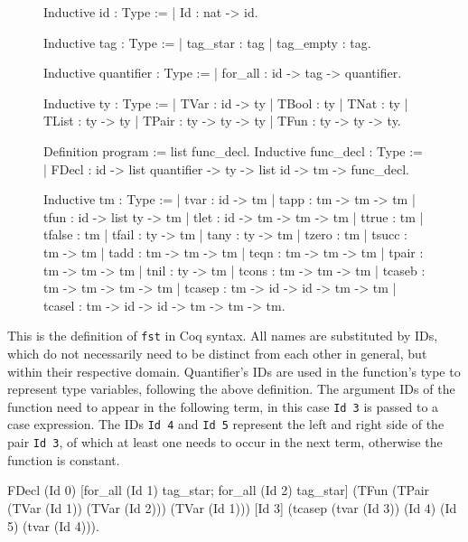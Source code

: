 \documentclass[fleqn]{scrreprt}
\newcommand{\todo}[1]{\marginpar{\textbf{TODO:} #1}}
\newcommand{\coqinline}[1]{\texttt{#1}}
\begin{document}
\begin{figure}[H]
\begin{minipage}[t]{.5 \linewidth}
\begin{coqcode}
Inductive id : Type :=
| Id : nat -> id.

Inductive tag : Type :=
| tag_star  : tag
| tag_empty : tag.

Inductive quantifier : Type :=
| for_all : id -> tag -> quantifier.

Inductive ty : Type :=
| TVar  : id -> ty
| TBool : ty
| TNat  : ty
| TList : ty -> ty
| TPair : ty -> ty -> ty
| TFun  : ty -> ty -> ty.

Definition program := list func_decl.
Inductive func_decl : Type :=
| FDecl : id -> list quantifier -> ty -> list id -> tm -> func_decl.
\end{coqcode}
\end{minipage}
\begin{minipage}[t]{.5 \linewidth}
	\begin{coqcode}
Inductive tm : Type :=
  | tvar   : id -> tm
  | tapp   : tm -> tm -> tm
  | tfun   : id -> list ty -> tm
  | tlet   : id -> tm -> tm -> tm
  | ttrue  : tm
  | tfalse : tm
  | tfail  : ty -> tm
  | tany   : ty -> tm
  | tzero  : tm
  | tsucc  : tm -> tm
  | tadd   : tm -> tm -> tm
  | teqn   : tm -> tm -> tm
  | tpair  : tm -> tm -> tm
  | tnil   : ty -> tm
  | tcons  : tm -> tm -> tm
  | tcaseb : tm -> tm -> tm -> tm
  | tcasep : tm -> id -> id -> tm -> tm
  | tcasel : tm -> id -> id -> tm -> tm -> tm.
	\end{coqcode}
\end{minipage}
\end{figure}
This \todo{label?}is the definition of \texttt{fst} in Coq syntax. All names are substituted by IDs, which do not necessarily need to be distinct from each other in general, but within their respective domain. Quantifier's IDs are used in the function's type to represent type variables, following the above definition. The argument IDs of the function need to appear in the following term, in this case \coqinline{Id 3} is passed to a case expression. The IDs \coqinline{Id 4} and \coqinline{Id 5} represent the left and right side of the pair \coqinline{Id 3}, of which at least one needs to occur in the next term, otherwise the function is constant.
\begin{coqcode}
FDecl (Id 0) 
      [for_all (Id 1) tag_star; for_all (Id 2) tag_star] 
      (TFun (TPair (TVar (Id 1)) (TVar (Id 2))) (TVar (Id 1)))
      [Id 3]
      (tcasep (tvar (Id 3)) (Id 4) (Id 5) (tvar (Id 4))).
\end{coqcode}
\end{document}
